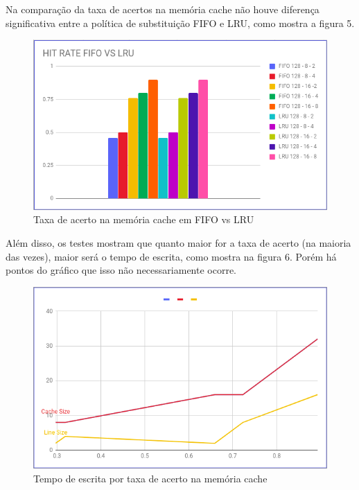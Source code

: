 \documentclass[conference]{IEEEtran}
\begin{document}
Na comparação da taxa de acertos na memória cache não houve diferença significativa entre a política de substituição FIFO e LRU, como mostra a figura 5.

\begin{figure}[H]
    \includegraphics[width=\linewidth]{Imagens/Hit_RATE_FIFO_VS_LRU.png}
    \caption{Taxa de acerto na memória cache em FIFO vs LRU}
    \label{fig:Taxa de acerto na memória cache em FIFO vs LRU}
\end{figure}


Além disso, os testes mostram que quanto maior for a taxa de acerto (na maioria das vezes), maior será o tempo de escrita, como mostra na figura 6. Porém há pontos do gráfico que isso não necessariamente ocorre.

\begin{figure}[H]
    \includegraphics[width=\linewidth]{Imagens/WRITE_TIME_POR_HIT_RATE.png}
    \caption{Tempo de escrita por taxa de acerto na memória cache}
    \label{fig:Tempo de escrita por taxa de acerto na memória cache}
\end{figure}
\end{document}
